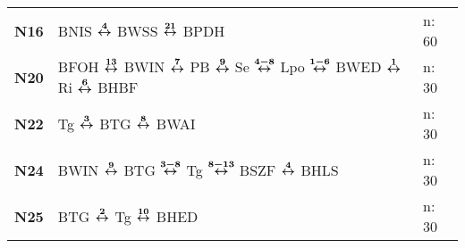 \begin{minipage}[t]{0.45\textwidth}
\begin{tabular}{>{\bfseries}L{1.2cm}L{9.0cm}L{3.0cm}}
\nbus{} N16   & BNIS $\boldsymbol{\overset{4}{\leftrightarrow}}$ BWSS $\boldsymbol{\overset{21}{\leftrightarrow}}$ BPDH                                                                                                                             & n: 60                      \\
\nbus{} N20   & BFOH $\boldsymbol{\overset{13}{\leftrightarrow}}$ BWIN $\boldsymbol{\overset{7}{\leftrightarrow}}$ PB $\boldsymbol{\overset{9}{\leftrightarrow}}$ Se $\boldsymbol{\overset{4-8}{\leftrightarrow}}$ Lpo $\boldsymbol{\overset{1-6}{\leftrightarrow}}$ BWED $\boldsymbol{\overset{1}{\leftrightarrow}}$ Ri $\boldsymbol{\overset{6}{\leftrightarrow}}$ BHBF                                           & n: 30                      \\
\nbus{} N22   & Tg $\boldsymbol{\overset{3}{\leftrightarrow}}$ BTG $\boldsymbol{\overset{8}{\leftrightarrow}}$ BWAI                                                                                                                                 & n: 30                      \\
\nbus{} N24   & BWIN $\boldsymbol{\overset{9}{\leftrightarrow}}$ BTG $\boldsymbol{\overset{3-8}{\leftrightarrow}}$ Tg $\boldsymbol{\overset{8-13}{\leftrightarrow}}$ BSZF $\boldsymbol{\overset{4}{\leftrightarrow}}$ BHLS                                                                                          & n: 30                      \\
\nbus{} N25   & BTG $\boldsymbol{\overset{2}{\leftrightarrow}}$ Tg $\boldsymbol{\overset{10}{\leftrightarrow}}$ BHED                                                                                                                                & n: 30                      \\
\hline
\end{tabular}
\end{minipage}
